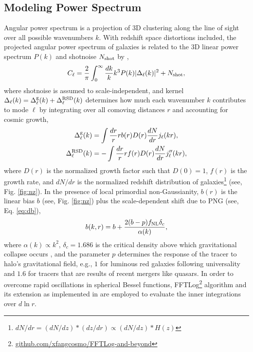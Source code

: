  \subsection{Modeling Power Spectrum}
Angular power spectrum is a projection of 3D clustering along the line of sight over all possible wavenumbers $k$. With redshift space distortions included, the projected angular power spectrum of galaxies is related to the 3D linear power spectrum $P(k)$ and shotnoise $N_{\rm shot}$ by \citep[see, e.g.,][]{Padmanabhan2007},
\begin{equation}\label{eq:cell}
    C_{\ell} = \frac{2}{\pi}\int_{0}^{\infty}\frac{dk}{k}k^{3}P(k)|\Delta_{\ell}(k)|^{2} + N_{\rm shot},
\end{equation}
where shotnoise is assumed to scale-independent, and kernel $\Delta_{\ell}(k) = \Delta^{\rm g}_{\ell}(k) + \Delta^{\rm RSD}_{\ell}(k)$ determines how much each wavenumber $k$ contributes to mode $\ell$ by integrating over all comoving distances $r$ and accounting for cosmic growth,
\begin{align}
    \Delta^{\rm g}_{\ell}(k) &= \int \frac{dr}{r} r b(r) D(r) \frac{dN}{dr} j_{\ell}(kr),\\
    \Delta^{\rm RSD}_{\ell}(k) &= - \int \frac{dr}{r} r f(r) D(r) \frac{dN}{dr} j^{\prime\prime}_{\ell}(kr),
\end{align}
where $D(r)$ is the normalized growth factor such that $D(0)=1$, $f(r)$ is the growth rate, and $dN/dr$ is the normalized redshift distribution of galaxies\footnote{$dN/dr = (dN/dz)*(dz/dr) \propto (dN/dz)*H(z)$} (see, Fig. \ref{fig:nz}). In the presence of local primordial non-Gaussianity, $b(r)$ is the linear bias $b$ (see, Fig. \ref{fig:nz}) plus the scale-dependent shift due to PNG (see, Eq. \ref{eq:db}),
\begin{equation}
b(k, r) = b + \frac{2 (b - p) f_{\rm NL} \delta_{c}}{\alpha (k)},
\end{equation}
where $\alpha(k) \propto k^{2}$, $\delta_{c}=1.686$ is the critical density above which gravitational collapse occurs \citep{fillmore1984self}, and the parameter $p$ determines the response of the tracer to halo's gravitational field, e.g., $1$ for luminous red galaxies following universality and $1.6$ for tracers that are results of recent mergers like quasars. In order to overcome rapid oscillations in spherical Bessel functions, FFTLog\footnote{\href{https://github.com/xfangcosmo/FFTLog-and-beyond}{github.com/xfangcosmo/FFTLog-and-beyond}} algorithm and its extension as implemented in \cite{fang2020beyond} are employed to evaluate the inner integrations over $d\ln r$.


